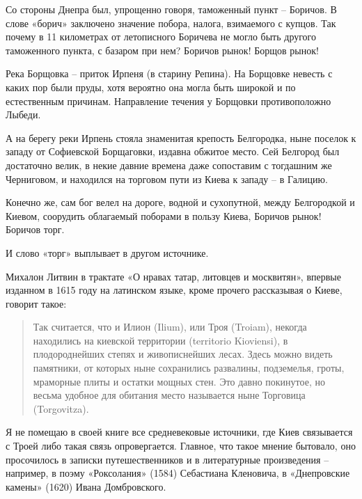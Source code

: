 Со стороны Днепра был, упрощенно говоря, таможенный пункт – Боричов. В слове «борич» заключено значение побора, налога, взимаемого с купцов. Так почему в 11 километрах от летописного Боричева не могло быть другого таможенного пункта, с базаром при нем? Боричов рынок! Борщов рынок!

Река Борщовка – приток Ирпеня (в старину Репина). На Борщовке невесть с каких пор были пруды, хотя вероятно она могла быть широкой и по естественным причинам. Направление течения у Борщовки противоположно Лыбеди.

А на берегу реки Ирпень стояла знаменитая крепость Белгородка, ныне поселок к западу от Софиевской Борщаговки, издавна обжитое место. Сей Белгород был достаточно велик, в некие давние времена даже сопоставим с тогдашним же Черниговом, и находился на торговом пути из Киева к западу – в Галицию.

Конечно же, сам бог велел на дороге, водной и сухопутной, между Белгородкой и Киевом, соорудить облагаемый поборами в пользу Киева, Боричов рынок! Боричов торг.

И слово «торг» выплывает в другом источнике.

Михалон Литвин в трактате «О нравах татар, литовцев и москвитян»\cite{litvin}, впервые изданном в 1615 году на латинском языке, кроме прочего рассказывая о Киеве, говорит такое:

\begin{quotation}
Так считается, что и Илион (Ilium), или Троя (Troiam), некогда находились на киевской территории (territorio Kioviensi), в плодороднейших степях и живописнейших лесах. Здесь можно видеть памятники, от которых ныне сохранились развалины, подземелья, гроты, мраморные плиты и остатки мощных стен. Это давно покинутое, но весьма удобное для обитания место называется ныне Торговица (Torgovitza).
\end{quotation}

Я не помещаю в своей книге все средневековые источники, где Киев связывается с Троей либо такая связь опровергается. Главное, что такое мнение бытовало, оно просочилось в записки путешественников и в литературные произведения – например, в поэму «Роксолания» (1584) Себастиана Кленовича, в «Днепровские камены» (1620) Ивана Домбровского.
